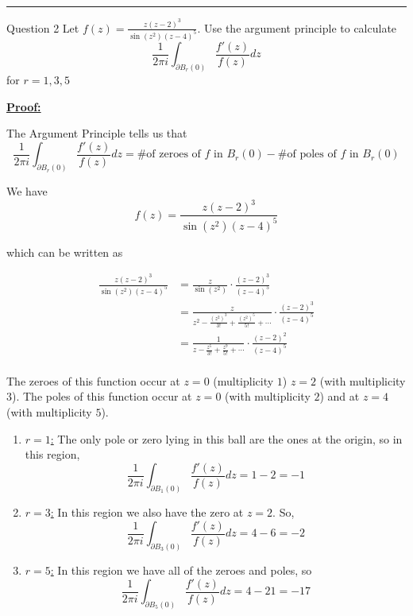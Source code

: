 \documentclass{article}
\begin{document}
\vskip 0.5cm
\hrule 
\vskip 0.5cm



\begin{mathdefinitionbox}{Question 2}
\vskip 0.5cm
Let $f(z) = \frac{z(z-2)^3}{\sin(z^2)(z-4)^5}$. Use the argument principle to calculate 
\[ \frac{1}{2\pi i} \int_{\partial B_r(0)} \frac{f'(z)}{f(z)} dz  \] for $r = 1, 3, 5$
\end{mathdefinitionbox}

\vskip 0.5cm
\underline{\textbf{Proof:}}

The Argument Principle tells us that 
\[ \frac{1}{2\pi i }\int_{\partial B_r(0)} \frac{f'(z)}{f(z)} dz = \text{\# of zeroes of $f$ in $B_r(0)$} - \text{\# of poles of $f$ in $B_r(0)$} \]

We have 
\[ f(z) = \frac{z(z-2)^3}{\sin\left(z^2\right)(z-4)^5}  \]

which can be written as 

\begin{align*}
  \frac{z(z-2)^3}{\sin\left(z^2\right)(z-4)^5} &= \frac{z}{\sin(z^2)} \cdot \frac{(z-2)^3}{(z-4)^5} \\
  &= \frac{z}{z^2 - \frac{(z^2)^3}{3!} + \frac{(z^2)^5}{5!} + \cdots} \cdot \frac{(z-2)^3}{(z-4)^5} \\
  &= \frac{1}{z - \frac{z^5}{3!} + \frac{z^9}{5!} + \cdots} \cdot \frac{(z-2)^2}{(z-4)^5} \\
\end{align*}

The zeroes of this function occur at $z = 0$ (multiplicity $1$) $z = 2$ (with multiplicity $3$). The poles of this function occur at $z = 0$ (with multiplicity $2$) and at $z = 4$ (with multiplicity $5$).


\begin{enumerate}[label=(\alph*)]
  \item \underline{$r = 1$:} The only pole or zero lying in this ball are the ones at the origin, so in this region, 
  \[ \frac{1}{2\pi i} \int_{\partial B_1(0)} \frac{f'(z)}{f(z)} dz = 1-2 = -1 \]

  \item \underline{$r = 3$:} In this region we also have the zero at $z = 2$. So, 
  \[ \frac{1}{2\pi i} \int_{\partial B_3(0)} \frac{f'(z)}{f(z)} dz = 4 - 6 = -2 \] 

  \item \underline{$r = 5$:} In this region we have all of the zeroes and poles, so
  \[ \frac{1}{2\pi i} \int_{\partial B_5(0)} \frac{f'(z)}{f(z)} dz = 4 - 21 = -17 \] 
\end{enumerate}
\end{document}
